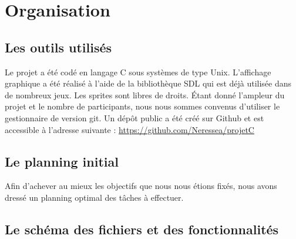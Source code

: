 \section{Organisation}

\subsection{Les outils utilisés}

Le projet a été codé en langage C sous systèmes de type Unix. L’affichage graphique a été réalisé à l’aide de la
bibliothèque SDL qui est déjà utilisée dans de nombreux jeux. Les sprites sont libres de droits. Étant donné l’ampleur du projet et le
nombre de participants, nous nous sommes convenus d’utiliser le gestionnaire de version git. Un dépôt public a été créé sur Github et est accessible à l'adresse suivante : \url{https://github.com/Neressea/projetC}

\subsection{Le planning initial}

Afin d'achever au mieux les objectifs que nous nous étions fixés, nous avons dressé un planning optimal des tâches à effectuer.

\subsection{Le schéma des fichiers et des fonctionnalités}


